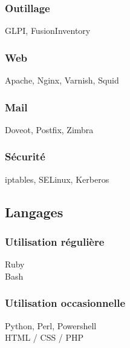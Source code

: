 \documentclass[a4paper]{tsacha-resume}
\begin{document}
\begin{minipage}[t]{0.35\textwidth}
  \subsubsection{Outillage}
  GLPI, FusionInventory

  \subsubsection{Web}
  Apache, Nginx, Varnish, Squid

  \subsubsection{Mail}
  Doveot, Postfix, Zimbra

  \subsubsection{Sécurité}
  iptables, SELinux, Kerberos


  \subsection{Langages}
  \subsubsection{Utilisation régulière}
  Ruby\\
  Bash

  \subsubsection{Utilisation occasionnelle}
  Python, Perl, Powershell\\
  HTML / CSS / PHP

\end{minipage}
\hfill
\end{document}
